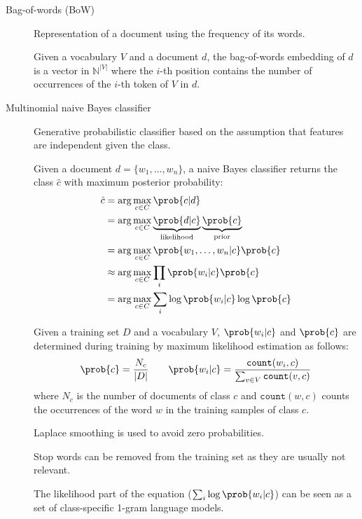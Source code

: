 \begin{description}
    \item[Bag-of-words (BoW)] 
        Representation of a document using the frequency of its words.

        Given a vocabulary $V$ and a document $d$, the bag-of-words embedding of $d$ is a vector in $\mathbb{N}^{\vert V \vert}$ where the $i$-th position contains the number of occurrences of the $i$-th token of $V$ in $d$.

    \item[Multinomial naive Bayes classifier] 
        Generative probabilistic classifier based on the assumption that features are independent given the class.

        Given a document $d = \{ w_1, \dots, w_n \}$, a naive Bayes classifier returns the class $\hat{c}$ with maximum posterior probability:
        \[
            \begin{split}
                \hat{c} &= \arg\max_{c \in C} \prob{c | d} \\
                &= \arg\max_{c \in C} \underbrace{\prob{d | c}}_{\text{likelihood}} \underbrace{\prob{c}}_{\text{prior}} \\
                &= \arg\max_{c \in C} \prob{w_1, \dots, w_n | c} \prob{c} \\
                &\approx \arg\max_{c \in C} \prod_{i} \prob{w_i | c} \prob{c} \\
                &= \arg\max_{c \in C} \sum_{i} \log\prob{w_i | c} \log\prob{c} \\
            \end{split}
        \]

        Given a training set $D$ and a vocabulary $V$, $\prob{w_i | c}$ and $\prob{c}$ are determined during training by maximum likelihood estimation as follows:
        \[
            \prob{c} = \frac{N_c}{\vert D \vert}
            \qquad
            \prob{w_i | c} = \frac{\texttt{count}(w_i, c)}{\sum_{v \in V} \texttt{count}(v, c)}
        \]
        where $N_c$ is the number of documents of class $c$ and $\texttt{count}(w, c)$ counts the occurrences of the word $w$ in the training samples of class $c$.

        \begin{remark}
            Laplace smoothing is used to avoid zero probabilities.
        \end{remark}

        \begin{remark}
            Stop words can be removed from the training set as they are usually not relevant.
        \end{remark}

        \begin{remark}
            The likelihood part of the equation ($\sum_{i} \log\prob{w_i | c}$) can be seen as a set of class-specific 1-gram language models.
        \end{remark}
\end{description}

